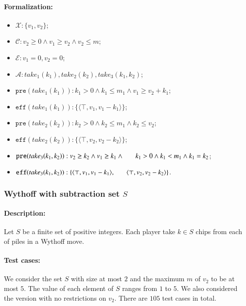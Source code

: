 \documentclass[review]{elsarticle}
\newcommand{\set}[1]{\{ #1 \}}
\newcommand{\tuple}[1]{\langle {#1} \rangle}
\newcommand{\true}{\top}
\newcommand{\statevar}{\mathcal{X}}
\newcommand{\act}{\mathcal{A}}
\newcommand{\constraint}{\mathcal{C}}
\newcommand{\estate}{\mathcal{E}}
\newcommand{\pre}{\mathtt{pre}}
\newcommand{\eff}{\mathtt{eff}}
\begin{document}
\paragraph{Formalization:}
\begin{itemize}
	\item $\statevar: \set{v_1, v_2}$;
	\item $\constraint: v_2 \ge 0 \wedge  v_1 \ge v_2 \wedge v_2 \le m$;
	\item $\estate: v_1 =0, v_2 = 0$;
	\item $\act:take_1(k_1), take_2(k_2), take_3(k_1,k_2)$;
	\item $\pre(take_1(k_1)) : k_1>0 \wedge k_1 \le m_1\wedge v_1 \ge v_2 + k_1$;  
	\item $\eff(take_1(k_1)) : \set{\tuple{\true, v_1, v_1-k_1}}$;
	\item $\pre(take_2(k_2)) : k_2>0 \wedge k_2\le m_1  \wedge k_2 \le v_2 $;
	\item $\eff(take_2(k_2)) : \set{\tuple{\true, v_2, v_2-k_2}}$;
	\item $\pre(take_3(k_1, k_2)) : v_2 \ge k_2 \wedge v_1 \ge k_1 \wedge \\ \hspace*{6mm} k_1 > 0 \wedge k_1<m_1 \wedge k_1 = k_2$;
	\item $\eff(take_3(k_1, k_2)) : \set{\tuple{\true, v_1, v_1 -k_1},\\ \hspace*{6mm} \tuple{\true, v_2, v_2 - k_2}}$.
\end{itemize}




\subsubsection{Wythoff with subtraction set $S$ \protect\cite{DucFGN2009} }

\paragraph{Description:}
Let $S$ be a finite set of positive integers.
Each player take $k \in S$ chips from each of piles in a Wythoff move.  %
\paragraph{Test cases:}
We consider the set $S$ with size at most $2$ and the maximum $m$ of $v_2$ to be at most $5$.
The value of each element of $S$ ranges from $1$ to $5$.
We also considered the version with no restrictions on $v_2$.
There are $105$ test cases in total.
\end{document}

